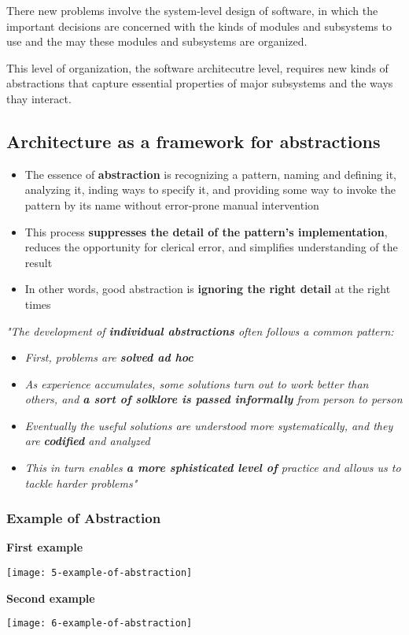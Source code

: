 There new problems involve the system-level design of software, in which the important decisions are concerned with the kinds of modules and subsystems to use and the may these modules and subsystems are organized.

This level of organization, the software architecutre level, requires new kinds of abstractions that capture essential properties of major subsystems and the ways thay interact.

\subsection{Architecture as a framework for abstractions}
\begin{itemize}
	\item The essence of \textbf{abstraction} is recognizing a pattern, naming and defining it, analyzing it, inding ways to specify it, and providing some way to invoke the pattern by its name without error-prone manual intervention
	\item This process \textbf{suppresses the detail of the pattern's implementation}, reduces the opportunity for clerical error, and simplifies understanding of the result
	\item In other words, good abstraction is \textbf{ignoring the right detail} at the right times
\end{itemize}

\textit{"The development of \textbf{individual abstractions} often follows a common pattern:}
\begin{itemize}
	\item \textit{First, problems are \textbf{solved ad hoc}}
	\item \textit{As experience accumulates, some solutions turn out to work better than others, and \textbf{a sort of solklore is passed informally} from person to person}
	\item \textit{Eventually the useful solutions are understood more systematically, and they are \textbf{codified} and analyzed}
	\item \textit{This in turn enables \textbf{a more sphisticated level of} practice and allows us to tackle harder problems"}
\end{itemize}

\subsubsection{Example of Abstraction}

\begin{center}

\textbf{First example}

\texttt{[image: 5-example-of-abstraction]}

\textbf{Second example}

\texttt{[image: 6-example-of-abstraction]}
\end{center}

